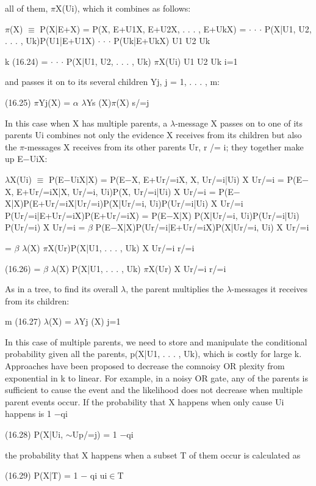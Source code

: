 all of them, $\pi$X(Ui), which it combines as follows:

$\pi$(X) $\equiv$ P(X|E+X) = P(X, E+U1X, E+U2X, . . . , E+UkX) = $\cdot$ $\cdot$ $\cdot$ P(X|U1, U2, . . . , Uk)P(U1|E+U1X) $\cdot$ $\cdot$ $\cdot$ P(Uk|E+UkX) U1 U2 Uk

k (16.24) = $\cdot$ $\cdot$ $\cdot$ P(X|U1, U2, . . . , Uk) $\pi$X(Ui) U1 U2 Uk i=1

and passes it on to its several children Yj, j = 1, . . . , m:

(16.25) $\pi$Yj(X) = $\alpha$ $\lambda$Ys (X)$\pi$(X) s/=j

In this case when X has multiple parents, a $\lambda$-message X passes on to one of its parents Ui combines not only the evidence X receives from its children but also the $\pi$-messages X receives from its other parents Ur, r /= i; they together make up E$-$UiX:

$\lambda$X(Ui) $\equiv$ P(E$-$UiX|X) = P(E$-$X, E+Ur/=iX, X, Ur/=i|Ui) X Ur/=i = P(E$-$X, E+Ur/=iX|X, Ur/=i, Ui)P(X, Ur/=i|Ui) X Ur/=i = P(E$-$X|X)P(E+Ur/=iX|Ur/=i)P(X|Ur/=i, Ui)P(Ur/=i|Ui) X Ur/=i P(Ur/=i|E+Ur/=iX)P(E+Ur/=iX) = P(E$-$X|X) P(X|Ur/=i, Ui)P(Ur/=i|Ui) P(Ur/=i) X Ur/=i = $\beta$ P(E$-$X|X)P(Ur/=i|E+Ur/=iX)P(X|Ur/=i, Ui) X Ur/=i

= $\beta$ $\lambda$(X) $\pi$X(Ur)P(X|U1, . . . , Uk) X Ur/=i r/=i

(16.26) = $\beta$ $\lambda$(X) P(X|U1, . . . , Uk) $\pi$X(Ur) X Ur/=i r/=i

As in a tree, to find its overall $\lambda$, the parent multiplies the $\lambda$-messages it receives from its children:

m (16.27) $\lambda$(X) = $\lambda$Yj (X) j=1

In this case of multiple parents, we need to store and manipulate the conditional probability given all the parents, p(X|U1, . . . , Uk), which is costly for large k. Approaches have been proposed to decrease the comnoisy OR plexity from exponential in k to linear. For example, in a noisy OR gate, any of the parents is sufficient to cause the event and the likelihood does not decrease when multiple parent events occur. If the probability that X happens when only cause Ui happens is 1 $-$qi

(16.28) P(X|Ui, $\sim$Up/=j) = 1 $-$qi

the probability that X happens when a subset T of them occur is calculated as

(16.29) P(X|T) = 1 $-$ qi ui$\in$T

